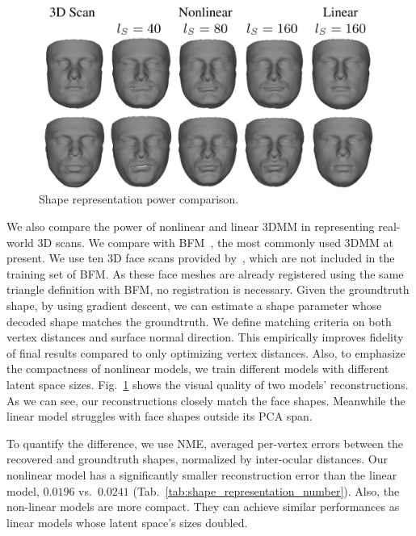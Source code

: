 \begin{figure}[t!]
\begin{center}
\small
\includegraphics[trim = 0 0 0 0, clip, width=0.95\linewidth]{./img/results/BU-4DFE/Linear_vs_Nonlinear.png}
\figvspace\vspace{1mm}
\caption{\small Shape representation power comparison.}
\label{fig:shape_representation}\figvspace
\end{center}
\end{figure}



We also compare the power of nonlinear and linear 3DMM in representing real-world 3D scans. 
We compare with BFM~\cite{paysan20093d}, the most commonly used 3DMM at present. 
We use ten 3D face scans provided by~\cite{paysan20093d}, which are not included in the training set of BFM.
As these face meshes are already registered using the same triangle definition with BFM,  no registration is necessary.
%
Given the groundtruth shape, by using gradient descent, we can estimate a shape parameter whose decoded shape matches the groundtruth. 
We define matching criteria on both vertex distances and surface normal direction. 
This empirically improves fidelity of final results compared to only optimizing vertex distances.
Also, to emphasize the compactness of nonlinear models, we train different models with different latent space sizes.
%
Fig.~\ref{fig:shape_representation} shows the visual quality of two models' reconstructions.
As we can see, our reconstructions closely match the face shapes. 
Meanwhile the linear model struggles with face shapes outside its PCA span.

To quantify the difference, we use NME, averaged per-vertex errors between the recovered and groundtruth shapes, normalized by inter-ocular distances. 
Our nonlinear model has a significantly smaller reconstruction error than the linear model, $0.0196$ vs.~$0.0241$ (Tab.~\ref{tab:shape_representation_number}). 
Also, the non-linear models are more compact. 
They can achieve similar performances as linear models whose latent space’s sizes doubled.

